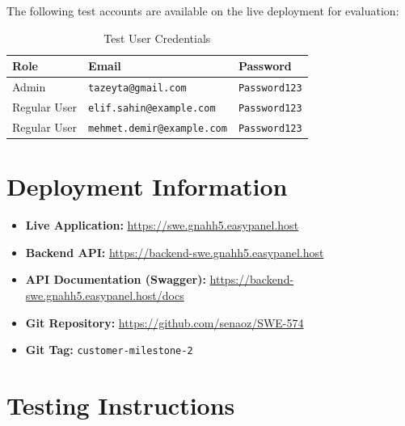 \documentclass[10pt,a4paper]{report}
\begin{document}
The following test accounts are available on the live deployment for evaluation:

\begin{table}[h]
    \centering
    \begin{tabular}{|l|l|l|}
        \hline
        \textbf{Role}       & \textbf{Email}                    & \textbf{Password}    \\
        \hline
        Admin               & \texttt{tazeyta@gmail.com}        & \texttt{Password123} \\
        \hline
        Regular User        & \texttt{elif.sahin@example.com}   & \texttt{Password123} \\
        \hline
        Regular User        & \texttt{mehmet.demir@example.com} & \texttt{Password123} \\
        \hline
    \end{tabular}
    \caption{Test User Credentials}
\end{table}

\section{Deployment Information}

\begin{itemize}
    \item \textbf{Live Application:} \url{https://swe.gnahh5.easypanel.host}
    \item \textbf{Backend API:} \url{https://backend-swe.gnahh5.easypanel.host}
    \item \textbf{API Documentation (Swagger):} \url{https://backend-swe.gnahh5.easypanel.host/docs}
    \item \textbf{Git Repository:} \url{https://github.com/senaoz/SWE-574}
    \item \textbf{Git Tag:} \texttt{customer-milestone-2}
\end{itemize}

\section{Testing Instructions}
\end{document}
